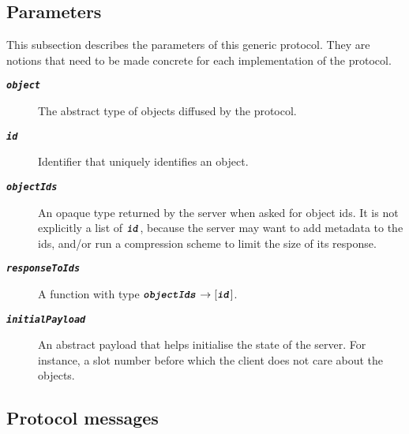 \subsection{Parameters}

This subsection describes the parameters of this generic protocol.
They are notions that need to be made concrete for each implementation of the protocol.

\newcommand\argfont[1]{\textbf{\texttt{\textit{#1}}}}

\begin{description}
\item [\argfont{object}] The abstract type of objects diffused by the protocol.
\item [\argfont{id}] Identifier that uniquely identifies an object.
\item [\argfont{objectIds}] An opaque type returned by the server when asked for object ids.
  It is not explicitly a list of $\argfont{id}$, because the server may want to add metadata to the ids, and/or run a compression scheme to limit the size of its response.
\item [\argfont{responseToIds}] A function with type $\argfont{objectIds} \rightarrow [\argfont{id}]$.
\item [\argfont{initialPayload}] An abstract payload that helps initialise the state of the server.
  For instance, a slot number before which the client does not care about the objects.
\end{description}

\subsection{Protocol messages}


